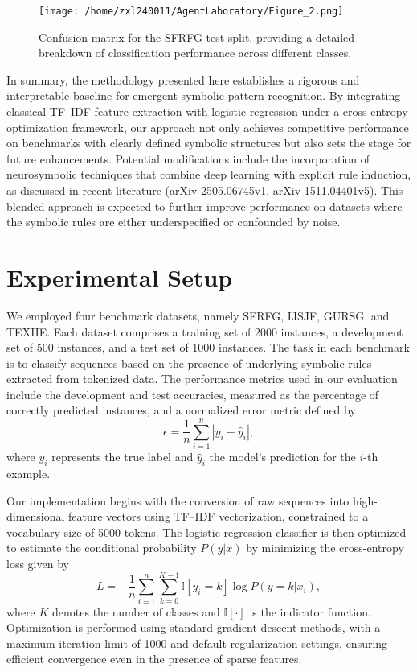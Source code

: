 \documentclass{article}
\begin{document}
\begin{figure}[h]
\caption{Confusion matrix for the SFRFG test split, providing a detailed breakdown of classification performance across different classes.}
\centering
\texttt{[image: /home/zxl240011/AgentLaboratory/Figure\_2.png]}
\label{fig:fig2}
\end{figure}

In summary, the methodology presented here establishes a rigorous and interpretable baseline for emergent symbolic pattern recognition. By integrating classical TF–IDF feature extraction with logistic regression under a cross-entropy optimization framework, our approach not only achieves competitive performance on benchmarks with clearly defined symbolic structures but also sets the stage for future enhancements. Potential modifications include the incorporation of neurosymbolic techniques that combine deep learning with explicit rule induction, as discussed in recent literature (arXiv 2505.06745v1, arXiv 1511.04401v5). This blended approach is expected to further improve performance on datasets where the symbolic rules are either underspecified or confounded by noise.

\section{Experimental Setup}
We employed four benchmark datasets, namely SFRFG, IJSJF, GURSG, and TEXHE. Each dataset comprises a training set of 2000 instances, a development set of 500 instances, and a test set of 1000 instances. The task in each benchmark is to classify sequences based on the presence of underlying symbolic rules extracted from tokenized data. The performance metrics used in our evaluation include the development and test accuracies, measured as the percentage of correctly predicted instances, and a normalized error metric defined by 
\[
\epsilon = \frac{1}{n} \sum_{i=1}^{n} \left| y_i - \hat{y}_i \right|,
\]
where \(y_i\) represents the true label and \(\hat{y}_i\) the model’s prediction for the \(i\)-th example.

Our implementation begins with the conversion of raw sequences into high-dimensional feature vectors using TF–IDF vectorization, constrained to a vocabulary size of 5000 tokens. The logistic regression classifier is then optimized to estimate the conditional probability \(P(y|x)\) by minimizing the cross-entropy loss given by
\[
L = -\frac{1}{n}\sum_{i=1}^{n}\sum_{k=0}^{K-1}\mathbb{I}[y_i=k]\log P(y=k|x_i),
\]
where \(K\) denotes the number of classes and \(\mathbb{I}[\cdot]\) is the indicator function. Optimization is performed using standard gradient descent methods, with a maximum iteration limit of 1000 and default regularization settings, ensuring efficient convergence even in the presence of sparse features.
\end{document}
